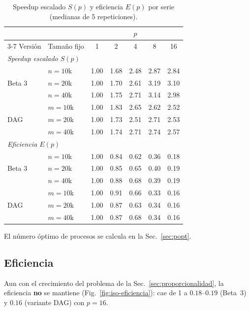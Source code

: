 \documentclass[11pt,a4paper]{article}
\newcommand{\ntr}{n}   %
\newcommand{\mte}{m}   %
\begin{document}
\begin{table}[H]
\centering
\caption{Speedup escalado $S(p)$ y eficiencia $E(p)$ por serie (medianas de 5 repeticiones).}
\label{tab:iso}
\small
\begin{tabular}{llccccc}
\toprule
 & & \multicolumn{5}{c}{$p$}\\
\cmidrule(lr){3-7}
Versión & Tamaño fijo & 1 & 2 & 4 & 8 & 16\\
\midrule
\multicolumn{7}{l}{\emph{Speedup escalado $S(p)$}}\\
\multirow{3}{*}{Beta 3} & $\ntr=10$k & 1.00 & 1.68 & 2.48 & 2.87 & 2.84\\
                        & $\ntr=20$k & 1.00 & 1.70 & 2.61 & 3.19 & 3.10\\
                        & $\ntr=40$k & 1.00 & 1.75 & 2.71 & 3.14 & 2.98\\
\multirow{3}{*}{DAG}    & $\mte=10$k & 1.00 & 1.83 & 2.65 & 2.62 & 2.52\\
                        & $\mte=20$k & 1.00 & 1.73 & 2.51 & 2.71 & 2.53\\
                        & $\mte=40$k & 1.00 & 1.74 & 2.71 & 2.74 & 2.57\\
\midrule
\multicolumn{7}{l}{\emph{Eficiencia $E(p)$}}\\
\multirow{3}{*}{Beta 3} & $\ntr=10$k & 1.00 & 0.84 & 0.62 & 0.36 & 0.18\\
                        & $\ntr=20$k & 1.00 & 0.85 & 0.65 & 0.40 & 0.19\\
                        & $\ntr=40$k & 1.00 & 0.88 & 0.68 & 0.39 & 0.19\\
\multirow{3}{*}{DAG}    & $\mte=10$k & 1.00 & 0.91 & 0.66 & 0.33 & 0.16\\
                        & $\mte=20$k & 1.00 & 0.87 & 0.63 & 0.34 & 0.16\\
                        & $\mte=40$k & 1.00 & 0.87 & 0.68 & 0.34 & 0.16\\
\bottomrule
\end{tabular}
\end{table}

El número óptimo de procesos se calcula en la Sec.~\ref{sec:popt}.

\subsection{Eficiencia}
Aun con el crecimiento del problema de la Sec.~\ref{sec:proporcionalidad}, la eficiencia
\textbf{no} se mantiene (Fig.~\ref{fig:iso-eficiencia}): cae de 1 a $0.18$--$0.19$ (Beta~3) y
$0.16$ (variante DAG) con $p=16$.
\end{document}
